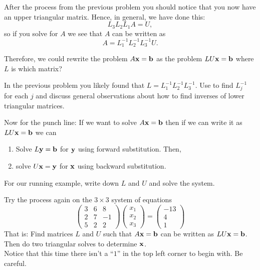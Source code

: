 \begin{problem}
    After the process from the previous problem you should notice that you now have an
    upper triangular matrix.  Hence, in general, we have done this:
    \[ L_3 L_2 L_1 A = U, \]
    so if you solve for $A$ we see that $A$ can be written as
    \[ A = L_1^{-1} L_2^{-1} L_3^{-1} U. \]
    
    Therefore, we could rewrite the problem $A {\bf x} = {\bf b}$ as the
    problem $LU{\bf x} = {\bf b}$ where $L$ is which matrix?
\end{problem}


\begin{problem}
    In the previous problem you likely found that $L = L_1^{-1} L_2^{-1} L_3^{-1}$.  Use
    \ProgLang to find $L_j^{-1}$ for each $j$ and discuss general observations about how to
    find inverses of lower triangular matrices.  
\end{problem}

\begin{problem}
    Now for the punch line: If we want to solve $A {\bf x} = {\bf b}$ then if we can write it as $LU
    {\bf x} = {\bf b}$ we can
    \begin{enumerate}
        \item Solve $L {\bf y} = {\bf b}$ for ${\bf y}$ using forward substitution.  Then,
        \item solve $U {\bf x} = {\bf y}$ for ${\bf x}$ using backward substitution.
    \end{enumerate}
    For our running example, write down $L$ and $U$ and solve the system.
\end{problem}

\begin{problem}
    Try the process again on the $3\times 3$ system of equations
    \[ \begin{pmatrix}
        3 & 6 & 8\\
        2 & 7 & -1 \\
        5 & 2 & 2 
    \end{pmatrix} \begin{pmatrix} x_1 \\ x_2 \\ x_3 \end{pmatrix} = 
        \begin{pmatrix} -13 \\ 4 \\ 1 \end{pmatrix} \]
    That is: Find matrices $L$ and $U$ such that $A {\bf x} = {\bf b}$ can be written as $LU{\bf x} =
    {\bf b}$.  Then do two triangular solves to determine ${\bf x}$.\\
    Notice that this time there isn't a ``$1$'' in the top left corner to begin with.  Be
    careful.
\end{problem}


